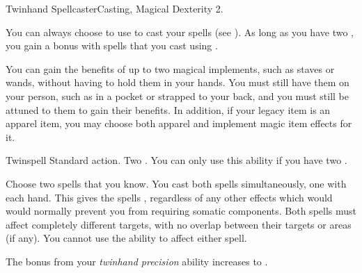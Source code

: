     \begin{magicalfeat}{Twinhand Spellcaster}{Casting, Magical}
        \featpre Dexterity 2.

         You can always choose to use  to cast your spells (see ).
        As long as you have two , you gain a   bonus with spells that you cast using .

         You can gain the benefits of up to two magical implements, such as staves or wands, without having to hold them in your hands.
        You must still have them on your person, such as in a pocket or strapped to your back, and you must still be attuned to them to gain their benefits.
        In addition, if your legacy item is an apparel item, you may choose both apparel and implement magic item effects for it.

        \begin{magicalactiveability}{Twinspell}
            \abilityusagetime Standard action.
            \abilitycost Two .
            \rankline
            You can only use this ability if you have two .

            Choose two spells that you know.
            You cast both spells simultaneously, one with each hand.
            This gives the spells , regardless of any other effects which would would normally prevent you from requiring somatic components.
            Both spells must affect completely different targets, with no overlap between their targets or areas (if any).
            You cannot use the  ability to affect either spell.
        \end{magicalactiveability}

         The bonus from your \textit{twinhand precision} ability increases to .
    \end{magicalfeat}

